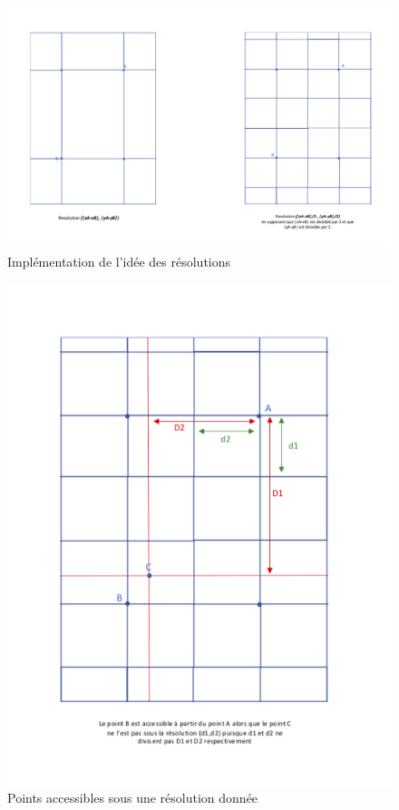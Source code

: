 \documentclass{article}
\begin{document}
\begin{figure}[!h]
\centering
\includegraphics[scale=0.3]{resol}
\caption{Implémentation de l'idée des résolutions}
\label{fig:resol}
\end{figure}

\begin{figure}[!h]
\centering
\includegraphics[scale=0.6]{grille}
\caption{Points accessibles sous une résolution donnée}
\label{fig:grille}
\end{figure}
\end{document}
